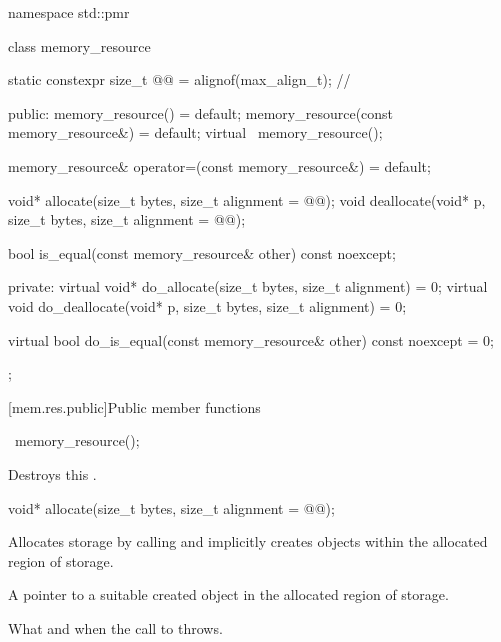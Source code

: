 %
%
\begin{codeblock}
namespace std::pmr {
  class memory_resource {
    static constexpr size_t @@ = alignof(max_align_t);   // \expos

  public:
    memory_resource() = default;
    memory_resource(const memory_resource&) = default;
    virtual ~memory_resource();

    memory_resource& operator=(const memory_resource&) = default;

    void* allocate(size_t bytes, size_t alignment = @@);
    void deallocate(void* p, size_t bytes, size_t alignment = @@);

    bool is_equal(const memory_resource& other) const noexcept;

  private:
    virtual void* do_allocate(size_t bytes, size_t alignment) = 0;
    virtual void do_deallocate(void* p, size_t bytes, size_t alignment) = 0;

    virtual bool do_is_equal(const memory_resource& other) const noexcept = 0;
  };
}
\end{codeblock}


[mem.res.public]{Public member functions}

%
\begin{itemdecl}
~memory_resource();
\end{itemdecl}

\begin{itemdescr}
\pnum
\effects
Destroys this .
\end{itemdescr}

%
\begin{itemdecl}
void* allocate(size_t bytes, size_t alignment = @@);
\end{itemdecl}

\begin{itemdescr}
\pnum
\effects
Allocates storage by calling  and
implicitly creates objects within the allocated region of storage.

\pnum
\returns
A pointer to a suitable created object
in the allocated region of storage.

\pnum
\throws
What and when the call to  throws.
\end{itemdescr}

